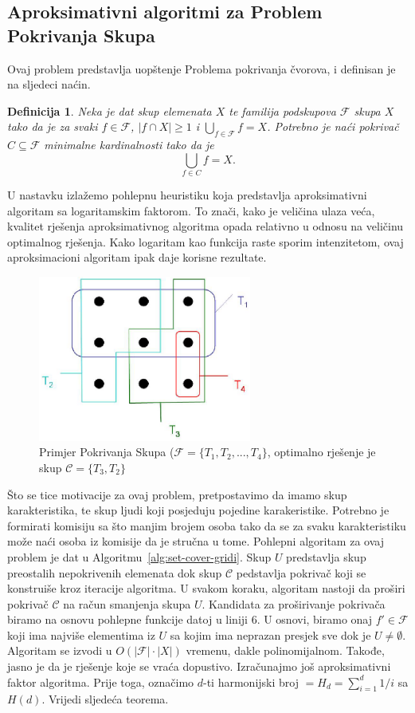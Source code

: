 \documentclass[a4paper, utf8, 11pt, colorlinks]{book}
\newtheorem{definition}{Definicija}
\begin{document}
 \subsection{Aproksimativni algoritmi za Problem Pokrivanja Skupa}
Ovaj problem predstavlja uopštenje Problema pokrivanja čvorova, i definisan je na sljedeci naćin.
\begin{definition}
	    Neka je dat skup elemenata $X$ te familija podskupova $\mathcal{F}$ skupa $X$ tako da je za svaki $f\in \mathcal{F}$, $|f \cap X| \geq 1$ i $\bigcup_{f \in \mathcal{F}} f = X$. 
	    Potrebno je naći pokrivač $C \subseteq \mathcal{F}$ minimalne kardinalnosti tako da je 
	    $$ \bigcup_{f \in C} f = X.$$
\end{definition}
 U nastavku izlažemo pohlepnu heuristiku koja predstavlja aproksimativni algoritam sa logaritamskim faktorom. To znači, kako je veličina ulaza veća, kvalitet rješenja aproksimativnog algoritma opada relativno u odnosu na veličinu optimalnog rješenja. Kako logaritam kao funkcija raste sporim intenzitetom, ovaj aproksimacioni algoritam ipak daje korisne rezultate.

\begin{figure}
	\centering
	\includegraphics[width=70mm]{set-cover-1.eps}
	\caption{Primjer Pokrivanja Skupa ($\mathcal{F}=\{T_1,T_2,...,T_4\}$, optimalno rješenje je skup $\mathcal{C}=\{T_3, T_2\}$}
	 \label{fig:set-cover-1}
\end{figure}

Što se tice motivacije za ovaj problem, pretpostavimo da imamo skup karakteristika, te skup ljudi koji posjeduju pojedine karakeristike. Potrebno je formirati komisiju sa što manjim brojem osoba tako da se za svaku karakteristiku može naći osoba iz komisije da je stručna u tome. Pohlepni algoritam za ovaj problem je dat u Algoritmu~\ref{alg:set-cover-gridi}.  %
Skup $U$ predstavlja skup preostalih nepokrivenih elemenata dok skup $\mathcal{C}$ pedstavlja pokrivač koji se konstruiše kroz iteracije algoritma. U svakom koraku, algoritam nastoji da proširi pokrivač $\mathcal{C}$ na račun smanjenja skupa $U$. Kandidata za proširivanje pokrivača biramo na osnovu pohlepne funkcije datoj u liniji 6. U osnovi, biramo onaj $f' \in \mathcal{F}$ koji ima najviše  elementima iz $U$ sa kojim ima neprazan presjek sve dok je $U \neq \emptyset$. Algoritam se izvodi u $O(|\mathcal{F}| \cdot |X|)$ vremenu, dakle  polinomijalnom. Takođe, jasno je da je rješenje koje se vraća dopustivo. Izračunajmo još aproksimativni faktor algoritma. Prije toga, označimo $d$-ti harmonijski broj $=H_d = \sum_{i=1}^d 1/i$ sa $H(d)$. 
Vrijedi sljedeća teorema.
\end{document}
